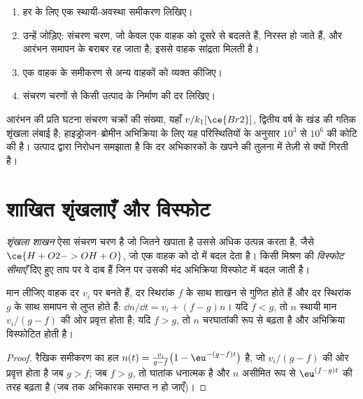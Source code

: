 \begin{method}[शृंखला क्रियाविधि का दर नियम]\label{met:b3:complex-kinetics:steady-state-chain}
\begin{enumerate}
  \item हर  के लिए एक स्थायी-अवस्था समीकरण लिखिए।
  \item उन्हें जोड़िए: संचरण चरण, जो केवल एक वाहक को दूसरे से बदलते हैं,
        निरस्त हो जाते हैं, और आरंभन समापन के बराबर रह जाता है; इससे
        वाहक सांद्रता मिलती है।
  \item एक वाहक के समीकरण से अन्य वाहकों को व्यक्त कीजिए।
  \item संचरण चरणों से किसी उत्पाद के निर्माण की दर लिखिए।
\end{enumerate}
\end{method}

आरंभन की प्रति घटना संचरण चक्रों की संख्या, यहाँ $v/k_1[\ce{Br2}]$,
द्वितीय वर्ष के खंड की गतिक शृंखला लंबाई है; हाइड्रोजन--ब्रोमीन अभिक्रिया के लिए
यह परिस्थितियों के अनुसार $10^3$ से $10^6$ की कोटि की है। उत्पाद द्वारा निरोधन
समझाता है कि दर अभिकारकों के खपने की तुलना में तेज़ी से क्यों गिरती है।

\section{शाखित शृंखलाएँ और विस्फोट}

\begin{definition}[शृंखला शाखन, विस्फोट सीमाएँ]\label{def:b3:complex-kinetics:branching}
\emph{शृंखला शाखन} ऐसा संचरण चरण है जो जितने
 खपाता है उससे अधिक उत्पन्न करता है, जैसे $\ce{H + O2 -> OH + O}$, जो एक
वाहक को दो में बदल देता है। किसी मिश्रण की \emph{विस्फोट सीमाएँ}
दिए हुए ताप पर वे दाब हैं जिन पर उसकी मंद अभिक्रिया
विस्फोट में बदल जाती है।
\end{definition}

\begin{proposition}[शाखन निकष]\label{prop:b3:complex-kinetics:branching}
मान लीजिए वाहक दर $v_i$ पर बनते हैं, दर
स्थिरांक $f$ के साथ शाखन से गुणित होते हैं और दर स्थिरांक $g$ के साथ समापन से लुप्त होते हैं:
$\dd n/\dd t = v_i + (f - g)n$। यदि $f < g$, तो $n$ स्थायी मान $v_i/(g - f)$ की ओर प्रवृत्त होता है; यदि
$f > g$, तो $n$ चरघातांकी रूप से बढ़ता है और अभिक्रिया विस्फोटित होती है।
\end{proposition}

\begin{proof}
रैखिक समीकरण का हल $n(t) = \frac{v_i}{g - f}\bigl(1 - \eu^{-(g - f)t}\bigr)$ है, जो
$v_i/(g - f)$ की ओर प्रवृत्त होता है जब $g > f$; जब $f > g$, तो घातांक धनात्मक है और $n$
असीमित रूप से $\eu^{(f - g)t}$ की तरह बढ़ता है (जब तक अभिकारक समाप्त न हो जाएँ)।
\end{proof}

